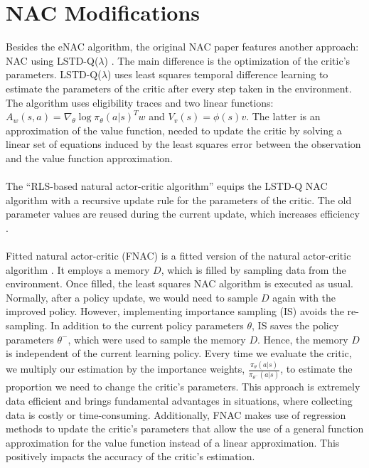 \section{NAC Modifications}
\label{sec:modifications}
\vspace{-2mm}
 Besides the eNAC algorithm, the original NAC paper \citep{peters2005natural} features another approach: NAC using LSTD-Q($\lambda$) \citep{boyan2002technical, lagoudakis2003least}. The main difference is the optimization of the critic's parameters. LSTD-Q($\lambda$) uses least squares temporal difference learning \citep{boyan1999least} to estimate the parameters of the critic after every step taken in the environment. The algorithm uses eligibility traces \cite{sutton2018reinforcement} and two linear functions: $A_w(s,a) = \nabla_{\theta} \log \pi_{\theta}(a|s)^Tw$ and $V_v(s) = \phi(s)v$.  The latter is an approximation of the value function, needed to update the critic by solving a linear set of equations induced by the least squares error between the observation and the value function approximation.
\\\\
 The ``RLS-based natural actor-critic algorithm'' equips the LSTD-Q NAC algorithm with a recursive update rule for the parameters of the critic. The old parameter values are reused during the current update, which increases efficiency \citep{park2005rls,xu2002efficient}.
\\\\
 Fitted natural actor-critic (FNAC) is a fitted version of the natural actor-critic algorithm \cite{melo2008fitted}.  It employs a memory $D$, which is filled by sampling data from the environment. Once filled, the least squares NAC algorithm is executed as usual. Normally, after a policy update, we would need to sample $D$ again with the improved policy. However, implementing importance sampling (IS) \cite{sutton2018reinforcement} avoids the re-sampling. In addition to the current policy parameters $\theta$, IS saves the policy parameters $\theta^{-}$, which were used to sample the memory $D$. Hence, the memory $D$ is independent of the current learning policy. Every time we evaluate the critic, we multiply our estimation by the importance weights, \(\tfrac{\pi_{\theta}(a|s)}{\pi_{\theta^{-}}(a|s)}\), to estimate the proportion we need to change the critic's parameters. This approach is extremely data efficient and brings fundamental advantages in situations, where collecting data is costly or time-consuming. Additionally, FNAC makes use of regression methods to update the critic's parameters that allow the use of a general function approximation for the value function instead of a linear approximation. This positively impacts the accuracy of the critic's estimation. 
